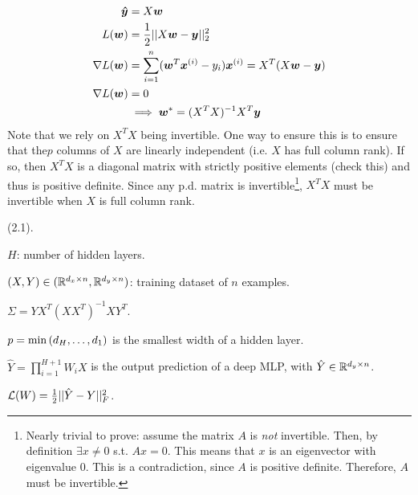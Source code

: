 \documentclass[11pt]{article}
\renewcommand\vec[2][]{\bm{#2}_{#1}}
\begin{document}
\label{Papers}








\begin{example}
\begin{align}
	\vec{\hat y} &= X\vec w \\
	L(\vec w) &= \onehalf || X\vec w - \vec y ||_2^2 \\
	\nabla L(\vec w)
		&= \insum (\vec{w}^T \ivec[i]{x} - y_i) \ivec[i]{x} = X^T (X\vec w - \vec y) \\
	\nabla L(\vec w)
		&= 0 \\
		&\implies \vec{w}^* = (X^T X)^{-1} X^T \vec y
\end{align}
Note that we rely on $X^T X$ being invertible. One way to ensure this is to ensure that the$p$ columns of $X$ are linearly independent (i.e. $X$ has full column rank). If so, then $X^T X$ is a diagonal matrix with strictly positive elements (check this) and thus is positive definite. Since any p.d. matrix is invertible\footnote{Nearly trivial to prove: assume the matrix $A$ is \textit{not} invertible. Then, by definition $\exists x \neq 0$ s.t. $A x = 0$.  This means that $x$ is an eigenvector with eigenvalue $0$. This is a contradiction, since $A$ is positive definite. Therefore, $A$ must be invertible.}, $X^T X$ must be invertible when $X$ is full column rank. 
\end{example}

 (2.1). 
\begin{compactitem}
	\item $H$: number of hidden layers. 
	
	\item $(X, Y) \in (\mathbb{R}^{d_x \times n}, \mathbb{R}^{d_y \times n})$: training dataset of $n$ examples. 
	
	\item $\Sigma = Y X^T (X X^T)^{-1} XY^T$. 
	
	\item $p = \min \left( d_H, \ldots, d_1 \right)$ is the smallest width of a hidden layer. 
	
	\item $\hat Y = \prod_{i=1}^{H+1} W_i X$ is the output prediction of a deep MLP, with $\hat Y \in \mathbb{R}^{d_y \times n}$. 
	
	\item $\mathcal L(W) = \frac{1}{2} || \hat Y  - Y ||_F^2$. 
	
	
\end{compactitem}
\end{document}
